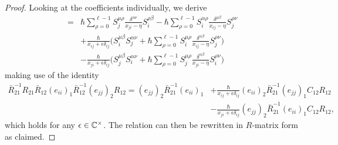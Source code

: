 \begin{proof}
Looking at the coefficients individually, we derive
\begin{align}
[S_i^{\alpha\beta},S_j^{\mu\nu}]
={}& \hbar \sum_{\rho=0}^{\ell-1} S_j^{\mu\rho} \frac{\delta^{\alpha\nu}}{x_{ji}-\eta} S_i^{\rho\beta} - \hbar \sum_{\rho=0}^{\ell-1} S_i^{\alpha\rho} \frac{\delta^{\mu\beta}}{x_{ij}-\eta} S_j^{\rho\nu} \label{eq:SS1} \\
&+ \frac{\hbar}{x_{ij}+\epsilon\delta_{ij}} \bigg( S_i^{\mu\beta} S_j^{\alpha\nu} + \hbar \sum_{\rho=0}^{\ell-1} S_i^{\mu\rho} \frac{\delta^{\alpha\beta}}{x_{ij}-\eta} S_j^{\rho\nu} \bigg) \label{eq:SS2} \\
&- \frac{\hbar}{x_{ji}+\epsilon\delta_{ij}} \bigg( S_j^{\mu\beta} S_i^{\alpha\nu} + \hbar \sum_{\rho=0}^{\ell-1} S_j^{\mu\rho} \frac{\delta^{\alpha\beta}}{x_{ji}-\eta} S_i^{\rho\nu} \bigg) \label{eq:SS3}
\end{align}
making use of the identity
\begin{align*}
\bar R_{21}^{-1} R_{21} \bar R_{12} (e_{ii})_1 \bar R_{12}^{-1} (e_{jj})_2 R_{12}
={} (e_{jj})_2 \bar R_{21}^{-1} (e_{ii})_1 &+ \frac{\hbar}{x_{ij}+\epsilon\delta_{ij}} (e_{ii})_2 \bar R_{21}^{-1} (e_{jj})_1 C_{12} R_{12} \\
&- \frac{\hbar}{x_{ji}+\epsilon\delta_{ij}} (e_{jj})_2 \bar R_{21}^{-1} (e_{ii})_1 C_{12} R_{12},
\end{align*}
which holds for any $\epsilon \in \mathbb{C}^\times$. The relation can then be rewritten in $R$-matrix form as claimed.
\end{proof}

